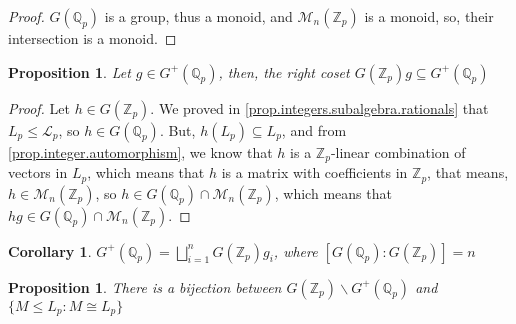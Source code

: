 \documentclass[12pt]{article}
\newtheorem{proposition}[theorem]{Proposition}
\newtheorem{corollary}[theorem]{Corollary}
\begin{document}
\begin{proof}
$G(\mathbb{Q}_p)$ is a group, thus a monoid, and $\mathcal{M}_n(\mathbb{Z}_p)$ is a monoid, so, their intersection is a monoid.
\end{proof}
\begin{proposition}
\label{prop.right.coset}
Let $g\in G^{+}(\mathbb{Q}_p)$, then, the right coset $G(\mathbb{Z}_p)g\subseteq G^{+}(\mathbb{Q}_p)$
\end{proposition}
\begin{proof}
Let $h\in G(\mathbb{Z}_p)$. We proved in \ref{prop.integers.subalgebra.rationals} that $L_p\leq\mathcal{L}_p$, so $h\in G(\mathbb{Q}_p)$. But, $h(L_p)\subseteq L_p$, and from \ref{prop.integer.automorphism}, we know that $h$ is a $\mathbb{Z}_p$-linear combination of vectors in $L_p$, which means that $h$ is a matrix with coefficients in $\mathbb{Z}_p$, that means, $h\in\mathcal{M}_n(\mathbb{Z}_p)$, so $h\in G({\mathbb
{Q}_p})\cap\mathcal{M}_n(\mathbb{Z}_p)$, which means that $hg\in G({\mathbb
{Q}_p})\cap\mathcal{M}_n(\mathbb{Z}_p)$.
\end{proof}
\begin{corollary}
\label{cor.coset.union}
$G^+(\mathbb{Q}_p)=\bigsqcup_{i=1}^n G(\mathbb{Z}_p)g_i$, where $[G(\mathbb{Q}_p):G(\mathbb{Z}_p)]=n$
\end{corollary}
\begin{proposition}
\label{prop.prop.coset.bijection}
There is a bijection between $G(\mathbb{Z}_p)\backslash G^+(\mathbb{Q}_p)$ and $\{M\leq L_p : M\cong L_p\}$
\end{proposition}
\end{document}
